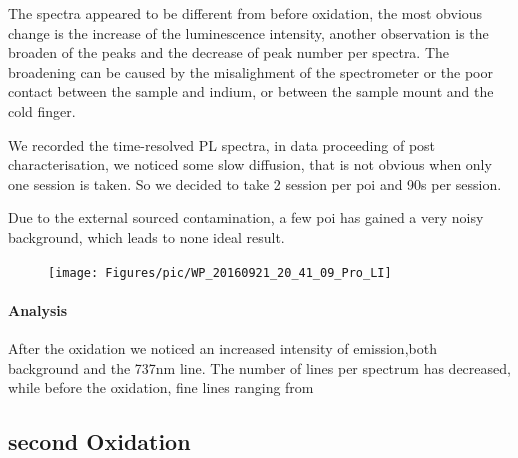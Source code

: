 The spectra appeared to be different from before oxidation, the most obvious change is the increase of the luminescence intensity, another observation is the broaden of the peaks and the decrease of peak number per spectra. The broadening can be caused by the misalighment of the spectrometer or the poor contact between the sample and indium, or between the sample mount and the cold finger. 

We recorded the time-resolved PL spectra, in data proceeding of post characterisation, we noticed some slow diffusion, that is not obvious when only one session is taken. So we decided to take 2 session per poi and 90s per session.

Due to the external sourced contamination, a few poi has gained a very noisy background, which leads to none ideal result.






\FloatBarrier
\begin{figure}[h]
\centering
\texttt{[image: Figures/pic/WP\_20160921\_20\_41\_09\_Pro\_LI]}
\caption{}
\label{fig:wp20160921204109proli}
\end{figure}
\FloatBarrier

\paragraph{Analysis}
After the oxidation we noticed an increased intensity of emission,both background and the 737nm line. The number of lines per spectrum has decreased, while before the oxidation, fine lines ranging from  

\subsection[Second Oxidation]{second Oxidation}

